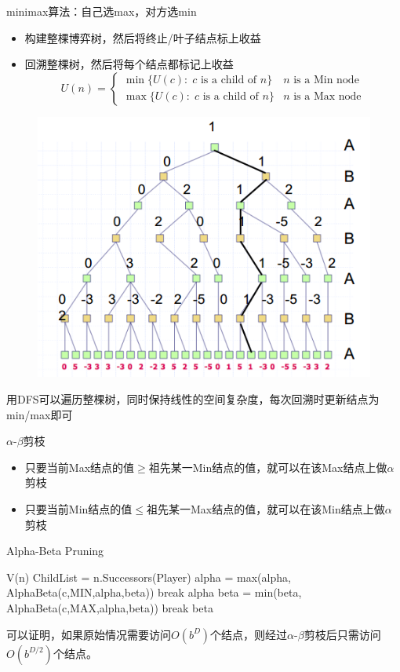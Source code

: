 minimax算法：自己选max，对方选min
\begin{itemize}
	\item 构建整棵博弈树，然后将终止/叶子结点标上收益
	\item 回溯整棵树，然后将每个结点都标记上收益
\[U(n)=
\begin{cases}
\min\{U(c):\;c \text{ is a child of } n\} & n \text{ is a Min node}\\
\max\{U(c):\;c \text{ is a child of } n\} & n \text{ is a Max node}
\end{cases}\]
\end{itemize}
\begin{figure}[H]
\centering
\includegraphics[width=0.6\linewidth]{fig/game-tree.png}
\end{figure}

用DFS可以遍历整棵树，同时保持线性的空间复杂度，每次回溯时更新结点为min/max即可

$\alpha$-$\beta$剪枝
\begin{itemize}
	\item 只要当前Max结点的值$\geq$祖先某一Min结点的值，就可以在该Max结点上做$\alpha$剪枝
	\item 只要当前Min结点的值$\leq$祖先某一Max结点的值，就可以在该Min结点上做$\alpha$剪枝
\end{itemize}
\begin{algorithm}
\caption{Alpha-Beta Pruning}
\begin{algorithmic}[1]
\State \Return V(n)
\EndIf
\State ChildList = n.Successors(Player)
\State alpha = max(alpha, AlphaBeta(c,MIN,alpha,beta))
\State break
\EndIf
\EndFor
\State \Return alpha
\Else{}
\State beta = min(beta, AlphaBeta(c,MAX,alpha,beta))
\State break
\EndIf
\EndFor
\State \Return beta
\EndIf
\EndProcedure{}
\end{algorithmic}
\end{algorithm}
可以证明，如果原始情况需要访问$O(b^D)$个结点，则经过$\alpha$-$\beta$剪枝后只需访问$O(b^{D/2})$个结点。

